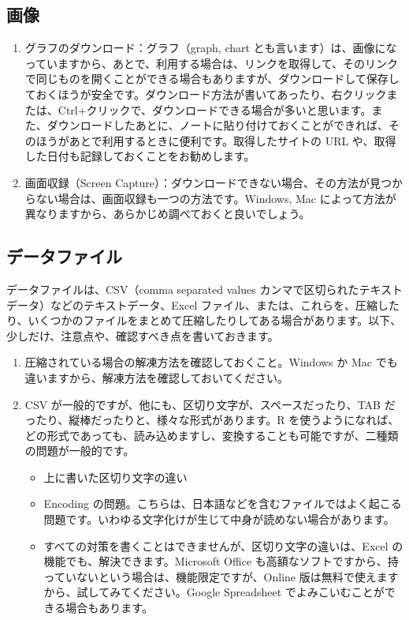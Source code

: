 \documentclass[
  xelatex, ja=standard]{bxjsbook}
\theoremstyle{definition}
\theoremstyle{definition}
\theoremstyle{definition}
\theoremstyle{definition}
\theoremstyle{remark}
\begin{document}
\hypertarget{ux753bux50cf}{%
\subsection{画像}\label{ux753bux50cf}}

\begin{enumerate}
\def\labelenumi{\arabic{enumi}.}
\item
  グラフのダウンロード：グラフ（graph, chart とも言います）は、画像になっていますから、あとで、利用する場合は、リンクを取得して、そのリンクで同じものを開くことができる場合もありますが、ダウンロードして保存しておくほうが安全です。ダウンロード方法が書いてあったり、右クリックまたは、Ctrl+クリックで、ダウンロードできる場合が多いと思います。また、ダウンロードしたあとに、ノートに貼り付けておくことができれば、そのほうがあとで利用するときに便利です。取得したサイトの URL や、取得した日付も記録しておくことをお勧めします。
\item
  画面収録（Screen Capture）：ダウンロードできない場合、その方法が見つからない場合は、画面収録も一つの方法です。Windows, Mac によって方法が異なりますから、あらかじめ調べておくと良いでしょう。
\end{enumerate}

\hypertarget{ux30c7ux30fcux30bfux30d5ux30a1ux30a4ux30eb}{%
\subsection{データファイル}\label{ux30c7ux30fcux30bfux30d5ux30a1ux30a4ux30eb}}

データファイルは、CSV（comma separated values カンマで区切られたテキストデータ）などのテキストデータ、Excel ファイル、または、これらを、圧縮したり、いくつかのファイルをまとめて圧縮したりしてある場合があります。以下、少しだけ、注意点や、確認すべき点を書いておきます。

\begin{enumerate}
\def\labelenumi{\arabic{enumi}.}
\item
  圧縮されている場合の解凍方法を確認しておくこと。Windows か Mac でも違いますから、解凍方法を確認しておいてください。
\item
  CSV が一般的ですが、他にも、区切り文字が、スペースだったり、TAB だったり、縦棒だったりと、様々な形式があります。R を使うようになれば、どの形式であっても、読み込めますし、変換することも可能ですが、二種類の問題が一般的です。

  \begin{itemize}
  \item
    上に書いた区切り文字の違い
  \item
    Encoding の問題。こちらは、日本語などを含むファイルではよく起こる問題です。いわゆる文字化けが生じて中身が読めない場合があります。
  \item
    すべての対策を書くことはできませんが、区切り文字の違いは、Excel の機能でも、解決できます。Microsoft Office も高額なソフトですから、持っていないという場合は、機能限定ですが、Online 版は無料で使えますから、試してみてください。Google Spreadsheet でよみこいむことができる場合もあります。
  \end{itemize}
\end{enumerate}
\end{document}
